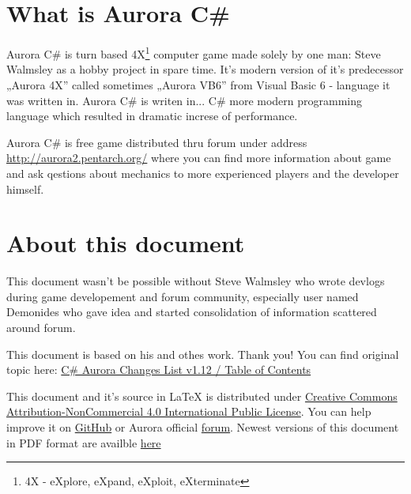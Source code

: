 \documentclass[../Aurora C# unofficial manual.tex]{subfiles}
\begin{document}
	\section{What is Aurora C\#}
	Aurora C\# is turn based 4X\footnote{4X - eXplore, eXpand, eXploit, eXterminate}
	computer game made solely by one man: Steve Walmsley as a hobby project in spare time.
	It's modern version of it's predecessor „Aurora 4X” called sometimes „Aurora VB6” from
	Visual Basic 6 - language it was written in. Aurora C\# is writen in... C\# more modern
	programming language which resulted in dramatic increse of performance.
	
	Aurora C\# is free game distributed thru forum under address
	\href{http://aurora2.pentarch.org/}{http://aurora2.pentarch.org/} where you can find
	more information about game and ask qestions about mechanics to more experienced
	players and the developer himself.
	
	
	\section{About this document}
	This document wasn't be possible without Steve Walmsley who wrote devlogs during game
	developement and forum community, especially user named Demonides who gave idea and
	started consolidation of information scattered around forum.
	
	This document is based on his and othes work. Thank you! You can find original topic
	here: \href{http://aurora2.pentarch.org/index.php?topic=10666.0}{C\# Aurora Changes List v1.12 / Table of Contents}
	
	This document and it's source in LaTeX is distributed under \href{https://creativecommons.org/licenses/by-nc/4.0/}{Creative Commons Attribution-NonCommercial 4.0 International Public License}. You can help improve it
	on \href{https://github.com/Pawel82S/Aurora-C-Sharp-manual}{GitHub} or Aurora official \href{http://aurora2.pentarch.org/}{forum}. Newest versions of this document in PDF format are availble \href{https://drive.google.com/drive/u/1/folders/1_AWEpFhS7e7ouguzrx8u0gnBHPhmjHoI}{here}
\end{document}
